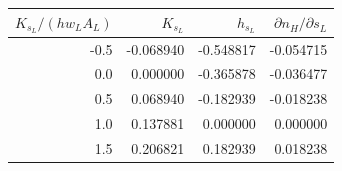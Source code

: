\begin{tabular}{rrrr}
\toprule
$K_{s_L}/(hw_LA_L)$ & $K_{s_L}$ & $h_{s_L}$ & $\partial n_H/\partial s_L$\\
\midrule
-0.5 & -0.068940 & -0.548817 & -0.054715\\
0.0 & 0.000000 & -0.365878 & -0.036477\\
0.5 & 0.068940 & -0.182939 & -0.018238\\
1.0 & 0.137881 & 0.000000 & 0.000000\\
1.5 & 0.206821 & 0.182939 & 0.018238\\
\bottomrule
\end{tabular}
